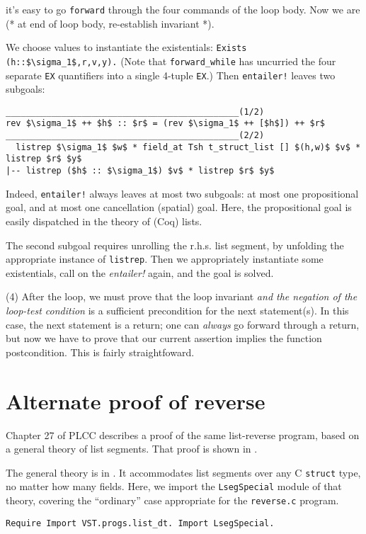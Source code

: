 \documentclass[12pt,fleqn,openany,oneside,showtrims]{memoir}
\begin{document}
  it's easy to go \lstinline{forward} through the four commands
  of the loop body.  Now we are
  \textsf{(* at end of loop body, re-establish invariant *).}

We choose values to instantiate the existentials:
\lstinline{Exists (h::$\sigma_1$,r,v,y).}  (Note that
\lstinline{forward_while} has uncurried
the four separate \lstinline{EX} quantifiers
into a single 4-tuple \lstinline{EX}.)  Then
\lstinline{entailer!} leaves two subgoals:
\begin{lstlisting}
______________________________________________(1/2)
rev $\sigma_1$ ++ $h$ :: $r$ = (rev $\sigma_1$ ++ [$h$]) ++ $r$
______________________________________________(2/2)
  listrep $\sigma_1$ $w$ * field_at Tsh t_struct_list [] $(h,w)$ $v$ * listrep $r$ $y$
|-- listrep ($h$ :: $\sigma_1$) $v$ * listrep $r$ $y$
\end{lstlisting}

Indeed, \lstinline{entailer!} always leaves at most two subgoals:
at most one propositional goal, and at most one
cancellation (spatial) goal.
Here, the propositional goal is easily dispatched in the
theory of (Coq) lists.

The second subgoal requires unrolling the r.h.s. list segment,
\label{unroll-the-list}
by unfolding the appropriate instance of \lstinline{listrep}.
Then we appropriately instantiate some existentials,
call on the \emph{entailer!} again, and the goal is solved.

(4) After the loop, we must prove that the loop invariant
\emph{and the negation of the loop-test condition} is a sufficient
precondition for the next statement(s).  In this case,
the next statement is a return; one can \emph{always}
go forward through a return, but now we have to prove
that our current assertion implies the function postcondition.
This is fairly straightfoward.

\chapter{Alternate proof of \textsf{reverse}}
\label{refcard:reverse-orig}

Chapter 27 of PLCC describes a proof of the same list-reverse program,
based on a general theory of list segments.  That proof is shown
in .

The general theory is in .
It accommodates list segments
over any C \lstinline{struct} type, no matter how many fields.
Here, we import
the \lstinline{LsegSpecial} module of that theory,
covering the ``ordinary'' case appropriate for the \lstinline{reverse.c} program.
\begin{lstlisting}
Require Import VST.progs.list_dt. Import LsegSpecial.
\end{lstlisting}
\end{document}
